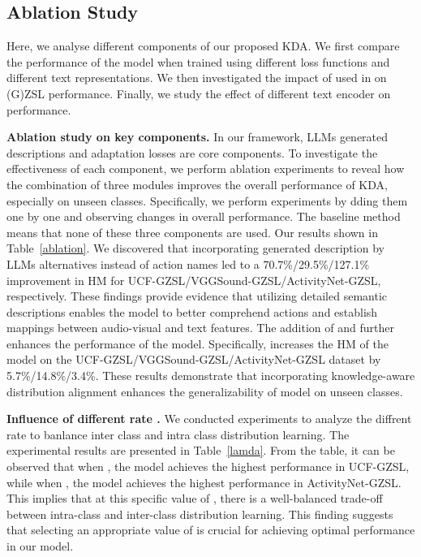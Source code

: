 \documentclass[10pt,twocolumn,letterpaper]{article}
\begin{document}
\subsection{Ablation Study}
Here, we analyse different components of our proposed KDA. We first compare the performance of the model when trained using different loss functions and different text representations. We then investigated the impact of  used in  on (G)ZSL performance. Finally, we study the effect of different text encoder on performance.

\noindent
\textbf{Ablation study on key components.}
In our framework, LLMs generated descriptions and adaptation losses are core components. 
To investigate the effectiveness of each component, we perform ablation experiments to reveal how the combination of three modules improves the overall performance of KDA, especially on unseen classes.
Specifically, we perform experiments by dding them one by one and observing changes in overall performance.
The baseline method means that none of these three components are used.
Our results shown in Table~\ref{ablation}.
We discovered that incorporating generated description by LLMs alternatives instead of action names led to a 70.7\%/29.5\%/127.1\% improvement in HM for UCF-GZSL/VGGSound-GZSL/ActivityNet-GZSL, respectively. These findings provide evidence that utilizing detailed semantic descriptions enables the model to better comprehend actions and establish mappings between audio-visual and text features.
The addition of  and  further enhances the performance of the model. 
Specifically, increases the HM of the model on the UCF-GZSL/VGGSound-GZSL/ActivityNet-GZSL dataset by 5.7\%/14.8\%/3.4\%.
These results demonstrate that incorporating knowledge-aware distribution alignment enhances the generalizability of model on unseen classes.


\noindent
\textbf{Influence of different rate .}
We conducted experiments to analyze the 
diffrent rate  to banlance inter class and intra class distribution learning.
The experimental results are presented in Table~\ref{lamda}. 
From the table, it can be observed that when , the model achieves the highest performance in UCF-GZSL, while when , the model achieves the highest performance in ActivityNet-GZSL.
This implies that at this specific value of , there is a well-balanced trade-off between intra-class and inter-class distribution learning. This finding suggests that selecting an appropriate value of  is crucial for achieving optimal performance in our model.
\end{document}

